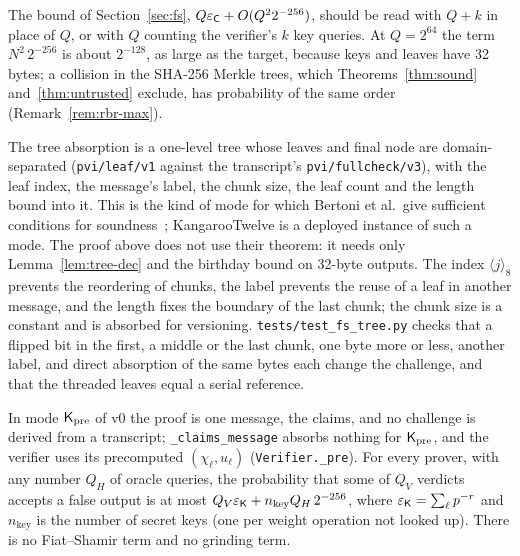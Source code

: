 \noindent The bound of Section~\ref{sec:fs}, $Q\varepsilon_{\mathsf{C}}+O(Q^22^{-256})$, should be read with
$Q+k$ in place of $Q$, or with $Q$ counting the verifier's $k$ key queries. At $Q=2^{64}$ the term
$N^2\,2^{-256}$ is about $2^{-128}$, as large as the target, because keys and leaves have 32 bytes;
a collision in the SHA-256 Merkle trees, which Theorems~\ref{thm:sound} and~\ref{thm:untrusted}
exclude, has probability of the same order (Remark~\ref{rem:rbr-max}).

\begin{remark}
\label{rem:tree}
The tree absorption is a one-level tree whose leaves and final node are domain-separated
(\texttt{pvi/leaf/v1} against the transcript's \texttt{pvi/fullcheck/v3}), with the leaf index, the
message's label, the chunk size, the leaf count and the length bound into it. This is the kind of
mode for which Bertoni et al.\ give sufficient conditions for soundness~\cite{bertoni2014tree};
KangarooTwelve is a deployed instance of such a mode. The proof above does not use their theorem:
it needs only Lemma~\ref{lem:tree-dec} and the birthday bound on 32-byte outputs. The index
$\langle j\rangle_8$ prevents the reordering of chunks, the label prevents the reuse of a leaf in
another message, and the length fixes the boundary of the last chunk; the chunk size is a constant
and is absorbed for versioning. \texttt{tests/test\_fs\_tree.py} checks that a flipped bit in the
first, a middle or the last chunk, one byte more or less, another label, and direct absorption of
the same bytes each change the challenge, and that the threaded leaves equal a serial reference.
\end{remark}

\begin{proposition}
\label{prop:kpre-fs}
In mode $\mathsf{K}_{\mathrm{pre}}$ of v0 the proof is one message, the claims, and no challenge is derived from a
transcript; \texttt{\_claims\_message} absorbs nothing for $\mathsf{K}_{\mathrm{pre}}$, and the verifier uses its
precomputed $(\chi_\ell,u_\ell)$ (\texttt{Verifier.\_pre}). For every prover, with any number $Q_H$
of oracle queries, the probability that some of $Q_V$ verdicts accepts a false output is at most
$Q_V\varepsilon_{\mathsf{K}}+n_{\mathrm{key}}Q_H\,2^{-256}$, where $\varepsilon_{\mathsf{K}}=\sum_\ell p^{-r}$ and
$n_{\mathrm{key}}$ is the number of secret keys (one per weight operation not looked up). There is
no Fiat--Shamir term and no grinding term.
\end{proposition}

